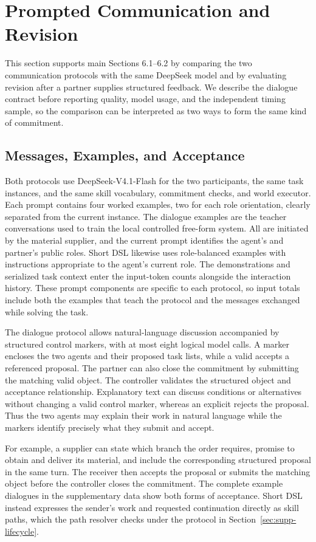 \documentclass[sigconf,nonacm,balance=false]{aamas}
\begin{document}
\section{Prompted Communication and Revision}
\label{sec:supp-prompted}
This section supports main Sections 6.1--6.2 by comparing the two communication protocols with the same DeepSeek model and by evaluating revision after a partner supplies structured feedback. We describe the dialogue contract before reporting quality, model usage, and the independent timing sample, so the comparison can be interpreted as two ways to form the same kind of commitment.

\subsection{Messages, Examples, and Acceptance}
Both protocols use DeepSeek-V4.1-Flash for the two participants, the same task instances, and the same skill vocabulary, commitment checks, and world executor. Each prompt contains four worked examples, two for each role orientation, clearly separated from the current instance. The dialogue examples are the teacher conversations used to train the local controlled free-form system. All are initiated by the material supplier, and the current prompt identifies the agent's and partner's public roles. Short DSL likewise uses role-balanced examples with instructions appropriate to the agent's current role. The demonstrations and serialized task context enter the input-token counts alongside the interaction history. These prompt components are specific to each protocol, so input totals include both the examples that teach the protocol and the messages exchanged while solving the task.

The dialogue protocol allows natural-language discussion accompanied by structured control markers, with at most eight logical model calls. A  marker encloses the two agents and their proposed task lists, while a valid  accepts a referenced proposal. The partner can also close the commitment by submitting the matching valid object. The controller validates the structured object and acceptance relationship. Explanatory text can discuss conditions or alternatives without changing a valid control marker, whereas an explicit  rejects the proposal. Thus the two agents may explain their work in natural language while the markers identify precisely what they submit and accept.

For example, a supplier can state which branch the order requires, promise to obtain and deliver its material, and include the corresponding structured proposal in the same turn. The receiver then accepts the proposal or submits the matching object before the controller closes the commitment. The complete example dialogues in the supplementary data show both forms of acceptance. Short DSL instead expresses the sender's work and requested continuation directly as skill paths, which the path resolver checks under the protocol in Section~\ref{sec:supp-lifecycle}.
\end{document}
